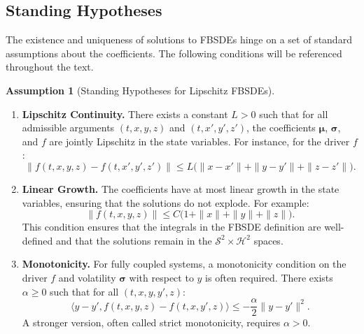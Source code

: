 \documentclass[11pt,letterpaper,oneside]{article}
\theoremstyle{plain}
\theoremstyle{definition}
\newtheorem{assumption}[theorem]{Assumption}
\theoremstyle{remark}
\begin{document}
\subsection*{Standing Hypotheses}
The existence and uniqueness of solutions to FBSDEs hinge on a set of standard assumptions about the coefficients. The following conditions will be referenced throughout the text.

\begin{assumption}[Standing Hypotheses for Lipschitz FBSDEs]
\label{def:standing_hypotheses}
\begin{enumerate}[label=(H\arabic*), leftmargin=1.5cm]
\item\label{H1} \textbf{Lipschitz Continuity.} There exists a constant \(L>0\) such that for all admissible arguments \((t,x,y,z)\) and \((t,x',y',z')\), the coefficients \(\bm\mu\), \(\bm\sigma\), and \(f\) are jointly Lipschitz in the state variables. For instance, for the driver \(f\):
      \[
        \|f(t,x,y,z)-f(t,x',y',z')\|
          \le L\bigl(\|x-x'\|+\|y-y'\|+\|z-z'\|\bigr).
      \]
\item\label{H2} \textbf{Linear Growth.} The coefficients have at most linear growth in the state variables, ensuring that the solutions do not explode. For example:
      \[
        \|f(t,x,y,z)\| \le C\bigl(1+\|x\|+\|y\|+\|z\|\bigr).
      \]
      This condition ensures that the integrals in the FBSDE definition are well-defined and that the solutions remain in the \(\mathcal{S}^2 \times \mathcal{H}^2\) spaces.
\item\label{H3} \textbf{Monotonicity.} For fully coupled systems, a monotonicity condition on the driver \(f\) and volatility \(\bm\sigma\) with respect to \(y\) is often required. There exists \(\alpha \ge 0\) such that for all \((t,x,y,y',z)\):
      \[
        \langle y-y', f(t,x,y,z)-f(t,x,y',z)\rangle
        \le -\frac{\alpha}{2}\|y-y'\|^2.
      \]
      A stronger version, often called strict monotonicity, requires \(\alpha > 0\).
\end{enumerate}
\end{assumption}
\end{document}
